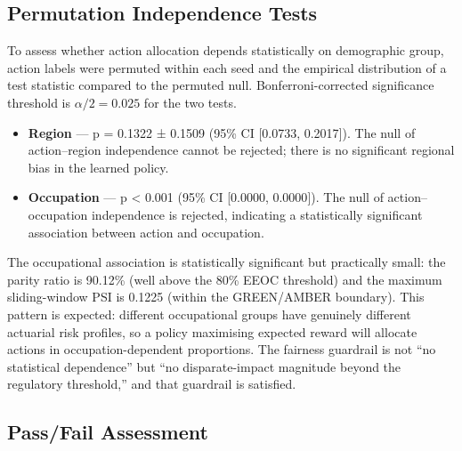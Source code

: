 
\subsection{Permutation Independence Tests}\label{permutation-independence-tests}

To assess whether action allocation depends statistically on demographic group, action labels were permuted within each seed and the empirical distribution of a test statistic compared to the permuted null. Bonferroni-corrected significance threshold is \(\alpha / 2 = 0.025\) for the two tests.

\begin{itemize}
\tightlist
\item
  \textbf{Region} --- p = 0.1322 ± 0.1509 (95\% CI {[}0.0733, 0.2017{]}). The null of action--region independence cannot be rejected; there is no significant regional bias in the learned policy.
\item
  \textbf{Occupation} --- p \textless{} 0.001 (95\% CI {[}0.0000, 0.0000{]}). The null of action--occupation independence is rejected, indicating a statistically significant association between action and occupation.
\end{itemize}

The occupational association is statistically significant but practically small: the parity ratio is 90.12\% (well above the 80\% EEOC threshold) and the maximum sliding-window PSI is 0.1225 (within the GREEN/AMBER boundary). This pattern is expected: different occupational groups have genuinely different actuarial risk profiles, so a policy maximising expected reward will allocate actions in occupation-dependent proportions. The fairness guardrail is not ``no statistical dependence'' but ``no disparate-impact magnitude beyond the regulatory threshold,'' and that guardrail is satisfied.

\subsection{Pass/Fail Assessment}\label{passfail-assessment-1}

